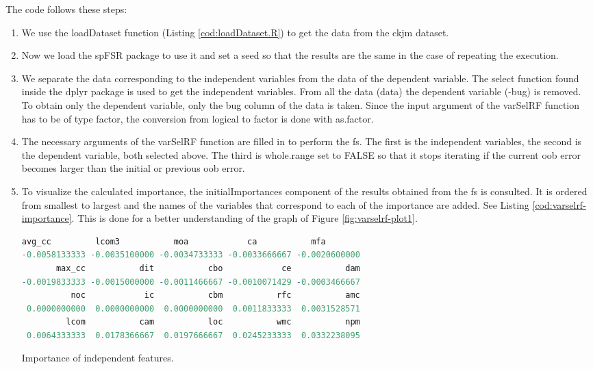 The code follows these steps:

\begin{enumerate}
    \item We use the loadDataset function (Listing \ref{cod:loadDataset.R}) to get the data from the ckjm dataset.
    
    \item Now we load the spFSR package to use it and set a seed so that the results are the same in the case of repeating the execution.
    
    \item We separate the data corresponding to the independent variables from the data of the dependent variable. The select function found inside the dplyr package is used to get the independent variables. From all the data (data) the dependent variable (-bug) is removed. To obtain only the dependent variable, only the bug column of the data is taken. Since the input argument of the varSelRF function has to be of type factor, the conversion from logical to factor is done with as.factor.
    
    \item The necessary arguments of the varSelRF function are filled in to perform the \acrshort{fs}. The first is the independent variables, the second is the dependent variable, both selected above. The third is whole.range set to FALSE so that it stops iterating if the current \acrshort{oob} error becomes larger than the initial or previous \acrshort{oob} error.
    
    \item To visualize the calculated importance, the initialImportances component of the results obtained from the \acrshort{fs} is consulted. It is ordered from smallest to largest and the names of the variables that correspond to each of the importance are added. See Listing \ref{cod:varselrf-importance}. This is done for a better understanding of the graph of Figure \ref{fig:varselrf-plot1}.
    
\begin{codefloat}[H]
\begin{lstlisting}[language=R, style=console]
       avg_cc         lcom3           moa            ca           mfa 
-0.0058133333 -0.0035100000 -0.0034733333 -0.0033666667 -0.0020600000 
       max_cc           dit           cbo            ce           dam 
-0.0019833333 -0.0015000000 -0.0011466667 -0.0010071429 -0.0003466667 
          noc            ic           cbm           rfc           amc 
 0.0000000000  0.0000000000  0.0000000000  0.0011833333  0.0031528571 
         lcom           cam           loc           wmc           npm 
 0.0064333333  0.0178366667  0.0197666667  0.0245233333  0.0332238095 
\end{lstlisting}
\caption{Importance of independent features.}
\label{cod:varselrf-importance}
\end{codefloat}


\end{enumerate}
